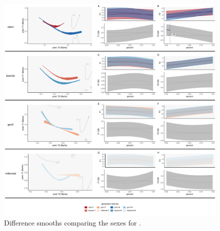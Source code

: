 \begin{figure}[p]
    \centering
    \includegraphics[width=\textwidth]{Figures/BANG/BANG_sex_panel_plot.pdf}
    \caption{Difference smooths comparing the sexes for \bang.}
    \label{fig:bang_diff_smooths_sex_gen}
\end{figure}


